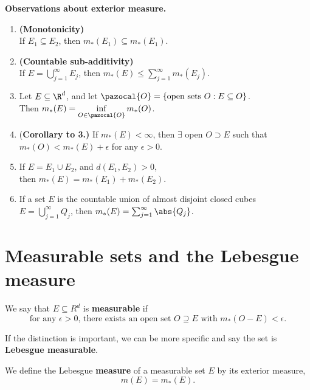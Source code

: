 \documentclass[a5paper, oneside]{book}
\numberwithin{theorem}{chapter}
\renewcommand{\script}[1]{\pazocal{#1}}
\newcommand{\extmeasure}[1]{m_*(#1)}
\begin{document}
\begin{highlight}
\textbf{Observations about exterior measure.} 
\begin{enumerate}[label=\textbf{\arabic*.}]
	\item \textbf{(Monotonicity)} \\
	If $E_1\subseteq E_2$, then $m_*(E_1)\subseteq m_*(E_1)$.
	\item \textbf{(Countable sub-additivity)} \\
	If $E=\bigcup\limits_{j=1}^\infty E_j$, then $\extmeasure{E}\leq\sum\limits_{j=1}^\infty \extmeasure{E_j}$. 
	\item Let $E\subseteq\R^d$, and let $\script{O}=\{\text{open sets }O:E\subseteq O\}$. \\Then $\extmeasure{E}=\inf\limits_{O\in\script{O}}\extmeasure{O}$.
	\item[] (\textbf{Corollary to 3.)} If $\extmeasure{E}<\infty$, then $\exists$ open $O\supset E$ such that $\extmeasure{O}<\extmeasure{E}+\epsilon$ for any $\epsilon>0$. 
	\item If $E=E_1\cup E_2$, and $d(E_1, E_2)>0$, \\
	then $\extmeasure{E}=\extmeasure{E_1}+\extmeasure{E_2}$. 
	\item If a set $E$ is the countable union of almost disjoint  closed cubes \\$E=\bigcup\limits_{j=1}^\infty Q_j$, then $\extmeasure{E}=\sum_{j=1}^\infty\abs{Q_j}$. 
	
\end{enumerate}
\end{highlight}

\pagebreak
\section{Measurable sets and the Lebesgue measure}

\begin{highlight}
\begin{definition*}
We say that $E \subseteq R^d$ is \textbf{measurable} if 
$$\text{for any } \epsilon > 0 \text{, there exists an open set } O \supseteq E \text{ with } m_*(O-E)<\epsilon.$$
\end{definition*}
\end{highlight}
If the distinction is important, we can be more specific and say the set is \textbf{Lebesgue measurable}.
\begin{highlight}
\begin{definition*}
We define the Lebesgue \textbf{measure} of a measurable set $E$ by its exterior measure, 
$$m(E)=m_*(E).$$
\end{definition*}
\end{highlight}
\end{document}
